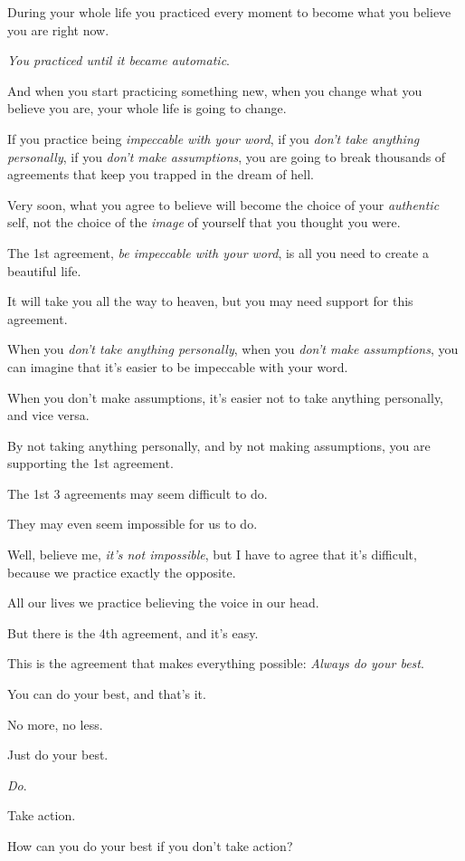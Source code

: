 \documentclass{article}
\numberwithin{equation}{section}
\begin{document}
%
During your whole life you practiced every moment to become what you believe you are right now.

\textit{You practiced until it became automatic}.

And when you start practicing something new, when you change what you believe you are, your whole life is going to change.

If you practice being \textit{impeccable with your word}, if you \textit{don't take anything personally}, if you \textit{don't make assumptions}, you are going to break thousands of agreements that keep you trapped in the dream of hell.

Very soon, what you agree to believe will become the choice of your \textit{authentic} self, not the choice of the \textit{image} of yourself that you thought you were.

%
The 1st agreement, \textit{be impeccable with your word}, is all you need to create a beautiful life.

It will take you all the way to heaven, but you may need support for this agreement.

When you \textit{don't take anything personally}, when you \textit{don't make assumptions}, you can imagine that it's easier to be impeccable with your word.

When you don't make assumptions, it's easier not to take anything personally, and vice versa.

By not taking anything personally, and by not making assumptions, you are supporting the 1st agreement.

%
The 1st 3 agreements may seem difficult to do.

They may even seem impossible for us to do.

Well, believe me, \textit{it's not impossible}, but I have to agree that it's difficult, because we practice exactly the opposite.

All our lives we practice believing the voice in our head.

But there is the 4th agreement, and it's easy.

This is the agreement that makes everything possible: \textit{Always do your best}.

You can do your best, and that's it.

No more, no less.

Just do your best.

\textit{Do}.

Take action.

How can you do your best if you don't take action?
\end{document}
